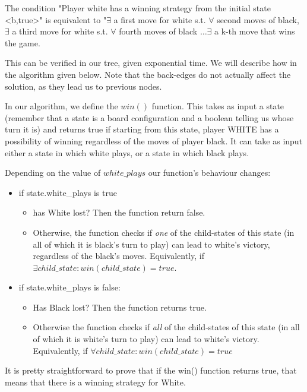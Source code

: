 The condition "Player white has a winning strategy from the initial state
<b,true>" is equivalent to "$\exists$ a first move for white s.t. $\forall$ second moves
of black, $\exists$ a third move for white s.t. $\forall$ fourth moves of black
$\ldots \exists$ a k-th move that wins the game.

This can be verified in our tree, given exponential time. We will describe how in the algorithm given below.
Note that the back-edges do not actually affect the solution, as they lead us to previous nodes.
\newline

In our algorithm, we define the $win()$ function. This takes as input a state (remember that
a state is a board configuration and a boolean telling us whose turn it is) and returns true if
starting from this state, player WHITE has a possibility of winning regardless of the moves of player black.
It can take as input either a state in which white plays, or a state in which black plays.

Depending on the value of $white\_plays$ our function's behaviour changes:
\begin{itemize}
\item if state.white\_plays is true \begin{itemize}
\item has White lost? Then the function return false.
\item Otherwise, the function checks if \emph{one} of the child-states of this state
(in all of which it is black's turn to play) can lead to white's victory, regardless of the black's moves.
Equivalently, if $\exists child\_state : win(child\_state) = true $.
\end{itemize}

\item if state.white\_plays is false: \begin{itemize}
\item Has Black lost? Then the function returns true.
\item Otherwise the function checks if \emph{all} of the child-states of this state
(in all of which it is white's turn to play) can lead to white's victory. Equivalently, if $\forall child\_state: win(child\_state) = true $
\end{itemize}
\end{itemize}


It is pretty straightforward to prove that if the win() function returns true,
that means that there is a winning strategy for White.

